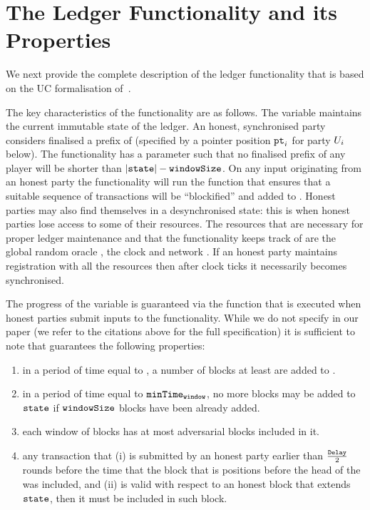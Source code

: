 \section{The Ledger Functionality and its Properties}
  We next provide the complete description of the ledger functionality that is
  based on the UC formalisation of~\cite{BMTZ17,genesis}.

  The key characteristics of the functionality are as follows. The variable
  \state maintains the current immutable state of the ledger. An honest,
  synchronised party considers finalised a prefix of \state (specified by a
  pointer position $\texttt{pt}_{i}$ for party $U_i$ below). The functionality has a
  parameter \windowSize such that no finalised prefix of any player will be
  shorter than $|\texttt{state}| - \texttt{windowSize}$. On any input originating from an honest
  party the functionality will run the \LFextend function that ensures that a
  suitable sequence of transactions will be ``blockified'' and added to \state.
  Honest parties may also find themselves in a desynchronised state: this is
  when honest parties lose access to some of their resources. The resources that
  are necessary for proper ledger maintenance and that the functionality keeps
  track of are the global random oracle \Foracle, the clock \Fclock and network
  \FnetworkEd. If an honest party maintains registration with all the resources
  then after \vdelay clock ticks it necessarily becomes synchronised.

  The progress of the \state variable is guaranteed via the \LFextend function
  that is executed when honest parties submit inputs to the functionality. While
  we do not specify \LFextend in our paper (we refer to the citations above for
  the full specification) it is sufficient to note that \LFextend guarantees the
  following properties:
  \begin{enumerate}
    \item in a period of time equal to \maxTime, a number of blocks at least
    \windowSize are
    added to \state.
    \item in a period of time equal to $\texttt{minTime}_\texttt{window}$, no more blocks may be added to $\texttt{state}$ if $\texttt{windowSize}$ blocks have been already added. 
    \item each window of \windowSize blocks has at most \advBlocksinWindowSize\/
    adversarial blocks included in it.
    \item any transaction that (i) is submitted by an honest party earlier than
    $\frac{\texttt{Delay}}{2}$ rounds before the time that the block that is
    \windowSize positions before the head of the \state was included, 
    and (ii) is valid with respect to an honest block that extends $\texttt{state}$,
    then it must be included in such block. 
  \end{enumerate}

